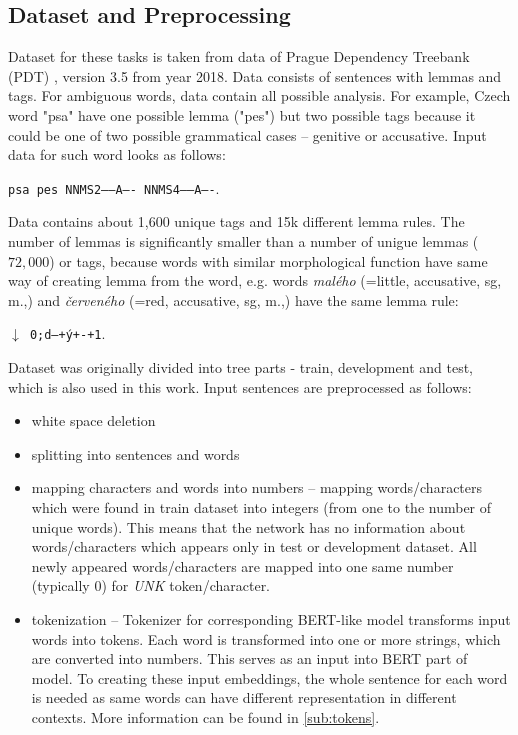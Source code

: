 \subsection{Dataset and Preprocessing}
\label{sub:dataset}
Dataset for these tasks is taken from data of Prague Dependency Treebank (PDT) \citep{PDT35}, version 3.5 from year 2018. Data consists of sentences with lemmas and tags. For ambiguous words, data contain all possible analysis. For example, Czech word "psa" have one possible lemma ("pes") but two possible tags because it could be one of two possible grammatical cases -- genitive or accusative. Input data for such word looks as follows: \\
\begin{center}
\texttt{psa pes NNMS2-----A---- NNMS4-----A----}.
\end{center}
Data contains about 1,600 unique tags and 15k different lemma rules. The number of lemmas is significantly smaller than a number of unigue lemmas ($72,000$) \citep{Strakova} or tags, because words with similar morphological function have same way of creating lemma from the word, e.g. words \textit{malého} (=little, accusative,  sg, m.,) and \textit{červeného}  (=red, accusative,  sg, m.,) have the same lemma rule:
\begin{center}
\texttt{$\downarrow$ 0;d\textbrokenbar ---+ý+-+1}.
\end{center} 
\par
Dataset was originally divided into tree parts - train, development and test, which is also used in this work. Input sentences are preprocessed as follows:
\begin{itemize}
\item white space deletion
\item splitting into sentences and words
\item mapping characters and words into numbers -- mapping  words/characters which were found in train dataset into integers (from one to the number of unique words). This means that the network has no information about words/characters which appears only in test or development dataset. All newly appeared words/characters are mapped into one same number (typically $0$) for \textit{UNK} token/character.
\item tokenization -- Tokenizer for corresponding BERT-like model transforms input words into tokens. Each word is transformed into one or more strings, which are converted into numbers. This serves as an input into BERT part of model. To creating these input embeddings, the whole sentence for each word is needed as same words can have different representation in different contexts. More information can be found in \ref{sub:tokens}.
\end{itemize}

